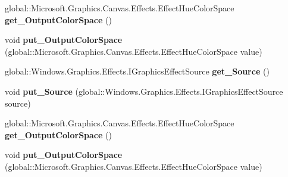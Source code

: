 \begin{DoxyCompactItemize}
\item 
\mbox{\label{interface_microsoft_1_1_graphics_1_1_canvas_1_1_effects_1_1_i_rgb_to_hue_effect_a53da861c46cdef87c6cdd66a1baf9798}} 
global\+::\+Microsoft.\+Graphics.\+Canvas.\+Effects.\+Effect\+Hue\+Color\+Space {\bfseries get\+\_\+\+Output\+Color\+Space} ()
\item 
\mbox{\label{interface_microsoft_1_1_graphics_1_1_canvas_1_1_effects_1_1_i_rgb_to_hue_effect_ad8679afd320843650369bba783e11405}} 
void {\bfseries put\+\_\+\+Output\+Color\+Space} (global\+::\+Microsoft.\+Graphics.\+Canvas.\+Effects.\+Effect\+Hue\+Color\+Space value)
\item 
\mbox{\label{interface_microsoft_1_1_graphics_1_1_canvas_1_1_effects_1_1_i_rgb_to_hue_effect_a84ea69b21839d230f7b651c8ff534060}} 
global\+::\+Windows.\+Graphics.\+Effects.\+I\+Graphics\+Effect\+Source {\bfseries get\+\_\+\+Source} ()
\item 
\mbox{\label{interface_microsoft_1_1_graphics_1_1_canvas_1_1_effects_1_1_i_rgb_to_hue_effect_a97e678d785f29e1d365bec9a84fc3940}} 
void {\bfseries put\+\_\+\+Source} (global\+::\+Windows.\+Graphics.\+Effects.\+I\+Graphics\+Effect\+Source source)
\item 
\mbox{\label{interface_microsoft_1_1_graphics_1_1_canvas_1_1_effects_1_1_i_rgb_to_hue_effect_a53da861c46cdef87c6cdd66a1baf9798}} 
global\+::\+Microsoft.\+Graphics.\+Canvas.\+Effects.\+Effect\+Hue\+Color\+Space {\bfseries get\+\_\+\+Output\+Color\+Space} ()
\item 
\mbox{\label{interface_microsoft_1_1_graphics_1_1_canvas_1_1_effects_1_1_i_rgb_to_hue_effect_ad8679afd320843650369bba783e11405}} 
void {\bfseries put\+\_\+\+Output\+Color\+Space} (global\+::\+Microsoft.\+Graphics.\+Canvas.\+Effects.\+Effect\+Hue\+Color\+Space value)
\item 

\end{DoxyCompactItemize}
